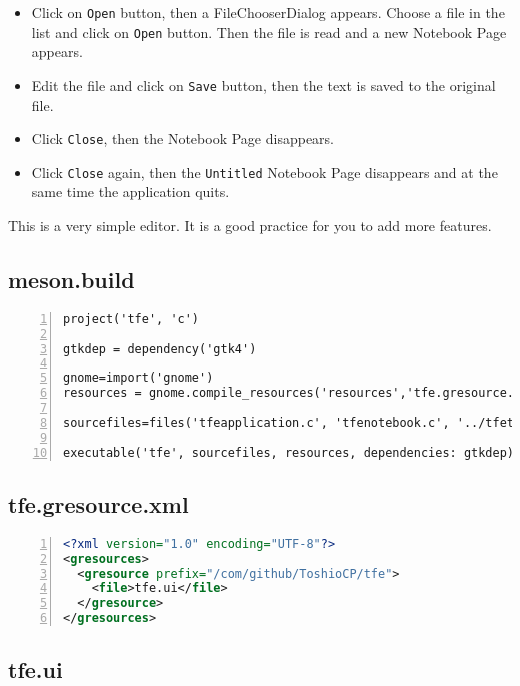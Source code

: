 \begin{itemize}
\tightlist
\item
  Click on \passthrough{\lstinline!Open!} button, then a
  FileChooserDialog appears. Choose a file in the list and click on
  \passthrough{\lstinline!Open!} button. Then the file is read and a new
  Notebook Page appears.
\item
  Edit the file and click on \passthrough{\lstinline!Save!} button, then
  the text is saved to the original file.
\item
  Click \passthrough{\lstinline!Close!}, then the Notebook Page
  disappears.
\item
  Click \passthrough{\lstinline!Close!} again, then the
  \passthrough{\lstinline!Untitled!} Notebook Page disappears and at the
  same time the application quits.
\end{itemize}

This is a very simple editor. It is a good practice for you to add more
features.

\hypertarget{meson.build}{%
\subsection{meson.build}\label{meson.build}}

\begin{lstlisting}[numbers=left]
project('tfe', 'c')

gtkdep = dependency('gtk4')

gnome=import('gnome')
resources = gnome.compile_resources('resources','tfe.gresource.xml')

sourcefiles=files('tfeapplication.c', 'tfenotebook.c', '../tfetextview/tfetextview.c')

executable('tfe', sourcefiles, resources, dependencies: gtkdep)
\end{lstlisting}

\hypertarget{tfe.gresource.xml}{%
\subsection{tfe.gresource.xml}\label{tfe.gresource.xml}}

\begin{lstlisting}[language=XML, numbers=left]
<?xml version="1.0" encoding="UTF-8"?>
<gresources>
  <gresource prefix="/com/github/ToshioCP/tfe">
    <file>tfe.ui</file>
  </gresource>
</gresources>
\end{lstlisting}

\hypertarget{tfe.ui}{%
\subsection{tfe.ui}\label{tfe.ui}}

